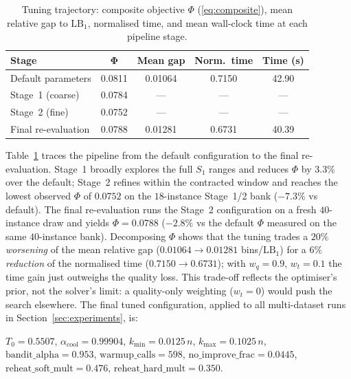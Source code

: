 \documentclass[conference]{IEEEtran}
\begin{document}
\begin{table}[htbp]
	\caption{Tuning trajectory: composite objective $\Phi$ (\ref{eq:composite}), mean relative gap to $\mathrm{LB}_1$, normalised time, and mean wall-clock time at each pipeline stage.}
	\label{tab:tuning}
	\centering
	\begin{tabular}{l c c c c}
		\hline
		\textbf{Stage}      & $\mathbf{\Phi}$ & \textbf{Mean gap} & \textbf{Norm.\ time} & \textbf{Time (s)} \\
		\hline
		Default parameters  & 0.0811          & 0.01064           & 0.7150               & 42.90             \\
		Stage~1 (coarse)    & 0.0784          & ---               & ---                  & ---               \\
		Stage~2 (fine)      & 0.0752          & ---               & ---                  & ---               \\
		Final re-evaluation & 0.0788          & 0.01281           & 0.6731               & 40.39             \\
		\hline
	\end{tabular}
\end{table}

Table~\ref{tab:tuning} traces the pipeline from the default configuration to the
final re-evaluation. Stage~1 broadly explores the full $S_1$ ranges and reduces
$\Phi$ by $3.3\%$ over the default; Stage~2 refines within the contracted
window and reaches the lowest observed $\Phi$ of $0.0752$ on the $18$-instance
Stage~1/2 bank ($-7.3\%$ vs default). The final re-evaluation runs the Stage~2
configuration on a fresh $40$-instance draw and yields $\Phi=0.0788$
($-2.8\%$ vs the default $\Phi$ measured on the same $40$-instance bank).
Decomposing $\Phi$ shows that the tuning trades a $20\%$ \emph{worsening} of
the mean relative gap ($0.01064 \to 0.01281$ bins/$\mathrm{LB}_1$) for a
$6\%$ \emph{reduction} of the normalised time
($0.7150 \to 0.6731$); with $w_q=0.9$, $w_t=0.1$ the time gain just outweighs
the quality loss. This trade-off reflects the optimiser's prior, not the
solver's limit: a quality-only weighting ($w_t=0$) would push the search
elsewhere. The final tuned configuration, applied to all multi-dataset runs
in Section~\ref{sec:experiments}, is:

$T_0=0.5507$,
$\alpha_{\mathrm{cool}}=0.99904$,
$k_{\min}=0.0125\,n$,
$k_{\max}=0.1025\,n$,
$\mathrm{bandit\_alpha}=0.953$,
$\mathrm{warmup\_calls}=598$,
$\mathrm{no\_improve\_frac}=0.0445$,
$\mathrm{reheat\_soft\_mult}=0.476$,
$\mathrm{reheat\_hard\_mult}=0.350$.
\end{document}
